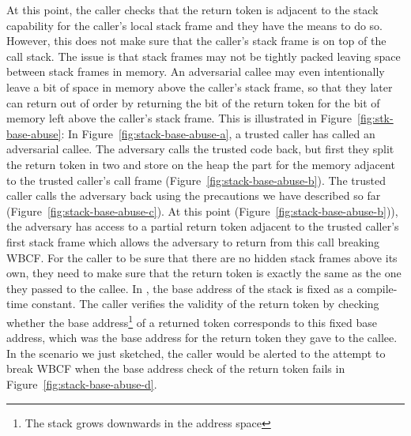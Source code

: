 \documentclass[acmsmall,review,anonymous]{acmart}\settopmatter{printfolios=true,printccs=false,printacmref=false}
\begin{document}
At this point, the caller checks that the return token is adjacent to the stack capability for the caller's local stack frame and they have the means to do so.
However, this does not make sure that the caller's stack frame is on top of the call stack.
The issue is that stack frames may not be tightly packed leaving space between stack frames in memory.
An adversarial callee may even intentionally leave a bit of space in memory above the caller's stack frame, so that they later can return out of order by returning the bit of the return token for the bit of memory left above the caller's stack frame.
This is illustrated in Figure~\ref{fig:stk-base-abuse}: In Figure~\ref{fig:stack-base-abuse-a}, a trusted caller has called an adversarial callee.
The adversary calls the trusted code back, but first they split the return token in two and store on the heap the part for the memory adjacent to the trusted caller's call frame (Figure~\ref{fig:stack-base-abuse-b}).
The trusted caller calls the adversary back using the precautions we have described so far (Figure~\ref{fig:stack-base-abuse-c}).
At this point (Figure~\ref{fig:stack-base-abuse-b})), the adversary has access to a partial return token adjacent to the trusted caller's first stack frame which allows the adversary to return from this call breaking WBCF.
For the caller to be sure that there are no hidden stack frames above its own, they need to make sure that the return token is exactly the same as the one they passed to the callee.
In \stktokens{}, the base address of the stack is fixed as a compile-time constant.
The caller verifies the validity of the return token by checking whether the base address\footnote{The stack grows downwards in the address space} of a returned token corresponds to this fixed base address, which was the base address for the return token they gave to the callee.
In the scenario we just sketched, the caller would be alerted to the attempt to break WBCF when the base address check of the return token fails in Figure~\ref{fig:stack-base-abuse-d}.
\end{document}
